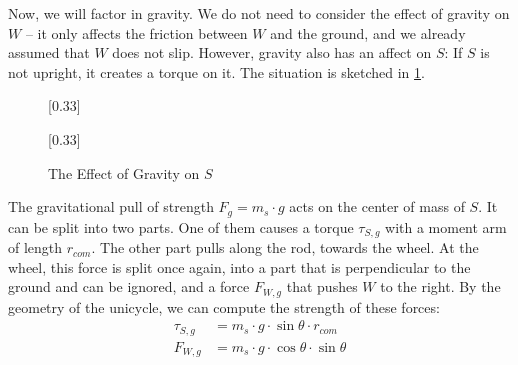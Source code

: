 \documentclass[copyright,submission]{eptcs}
\newcommand{\mi}[1]{\mathit{#1}}
\newcommand{\surface}{
    \begin{scope}[transparency group]
        \clip (-2,0) rectangle (2,-1);
        \draw[scope fading=south] (-2,0) rectangle (2,-1);
        \foreach \x in {-2,-1.75,...,3}
            \draw (\x,0) -- ($(\x,0) - (1,1)$);
    \end{scope}
}
\newcommand{\wheel}{
    \draw (0, 1) circle (1);
    \draw[fill] (0, 1) circle (0.05);
}
\newcommand{\saddle}[1][110]{
    \draw (0, 1) -- ([shift=(#1:3)] 0,1);
    \draw[fill] ([shift=(#1:0)] 0,1) circle (0.05);
    \draw[fill] ([shift=(#1:2)] 0,1) circle (0.03);
    \draw[fill] ([shift=(#1:3)] 0,1) circle (0.05);
}
\newcommand{\angletheta}[1][110]{
    \draw[dashed] (0, 1) -- (0, 3);
    \draw[dashed] ([shift=(90:1.5)] 0,1) arc (90:#1:1.5) node [midway, below] {$\theta$};
}
\begin{document}
Now, we will factor in gravity. We do not need to consider the effect of gravity on $W$ -- it only affects the friction between $W$ and the ground, and we already assumed that $W$ does not slip. However, gravity also has an affect on $S$: If $S$ is not upright, it creates a torque on it. The situation is sketched in \cref{fig:gravity-pull-on-s}.

\begin{figure}\centering
    [0.33\linewidth]{
        \centering{}
    }[0.33\linewidth]{
        \centering{}
    }
    \caption{\label{fig:gravity-pull-on-s} The Effect of Gravity on $S$}
\end{figure}

The gravitational pull of strength $F_g = m_s \cdot g$ acts on the center of mass of $S$. It can be split into two parts. One of them causes a torque $\tau_{S, g}$ with a moment arm of length $r_\mi{com}$. The other part pulls along the rod, towards the wheel. At the wheel, this force is split once again, into a part that is perpendicular to the ground and can be ignored, and a force $F_{W, g}$ that pushes $W$ to the right. By the geometry of the unicycle, we can compute the strength of these forces:
\begin{align}
    \tau_{S, g} &= m_s \cdot g \cdot \sin \theta \cdot r_\mi{com} \label{eqn:defining-tau-s-g} \\
    F_{W, g} &= m_s \cdot g \cdot \cos \theta \cdot \sin \theta \label{eqn:defining-f-w-g}
\end{align}
\end{document}
